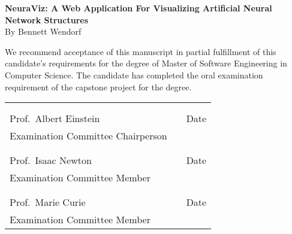 \thispagestyle{empty}
\vspace*{0.3in}
\begin{center}
	\large{\textbf{NeuraViz: A Web Application For Visualizing Artificial Neural Network Structures}} \\
	\vspace{0.75in}
	\normalsize{By Bennett Wendorf}
\end{center}

\vspace{0.5in}
\noindent We recommend acceptance of this manuscript in partial fulfillment of this candidate's requirements for the degree of Master of Software Engineering in Computer Science. The candidate has completed the oral examination requirement of the capstone project for the degree. \\

\noindent
\begin{tabularx}{\textwidth}{p{3in}Xp{2in}} %
	\rule{0pt}{50pt} & & \\
	\hrulefill & & \hrulefill \\
	Prof.\ Albert Einstein & & Date \\
	Examination Committee Chairperson & & \\
	\rule{0pt}{50pt} & & \\
	\hrulefill & & \hrulefill \\
	Prof.\ Isaac Newton & & Date \\
	Examination Committee Member & & \\
	\rule{0pt}{50pt} & & \\
	\hrulefill & & \hrulefill \\
	Prof.\ Marie Curie & & Date \\
	Examination Committee Member & & \\
\end{tabularx}

